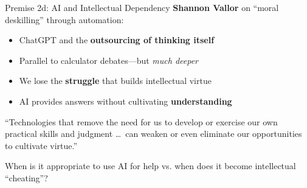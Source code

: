 ﻿\documentclass[aspectratio=169,11pt]{beamer}
\begin{document}
\begin{frame}{Premise 2d: AI and Intellectual Dependency}
\textbf{Shannon Vallor} on ``moral deskilling'' through automation:

\begin{itemize}
    \item ChatGPT and the \textbf{outsourcing of thinking itself}
    \item Parallel to calculator debates---but \textit{much deeper}
    \item We lose the \textbf{struggle} that builds intellectual virtue
    \item AI provides answers without cultivating \textbf{understanding}
\end{itemize}

\vspace{0.3cm}
\begin{quotebox}
``Technologies that remove the need for us to develop or exercise our own practical skills and judgment \ldots\ can weaken or even eliminate our opportunities to cultivate virtue.''
\end{quotebox}

\begin{discussionbox}[Discussion]
When is it appropriate to use AI for help vs. when does it become intellectual ``cheating''?
\end{discussionbox}
\end{frame}
\end{document}
